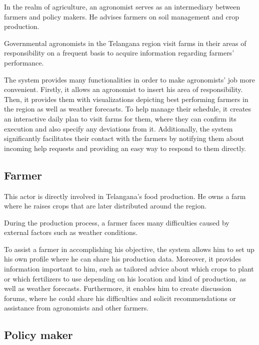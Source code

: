 In the realm of agriculture, an agronomist serves as an intermediary between farmers and policy makers. He advises farmers on soil management and crop production.

Governmental agronomists in the Telangana region visit farms in their areas of responsibility on a frequent basis to acquire information regarding farmers' performance.

The system provides many functionalities in order to make agronomists' job more convenient. Firstly, it allows an agronomist to insert his area of responsibility. Then, it provides them with visualizations depicting best performing farmers in the region as well as weather forecasts. To help manage their schedule, it creates an interactive daily plan to visit farms for them, where they can confirm its execution and also specify any deviations from it. Additionally, the system significantly facilitates their contact with the farmers by notifying them about incoming help requests and providing an easy way to respond to them directly.

\subsection{Farmer}

This actor is directly involved in Telangana's food production. He owns a farm where he raises crops that are later distributed around the region.

During the production process, a farmer faces many difficulties caused by external factors such as weather conditions.

To assist a farmer in accomplishing his objective, the system allows him to set up his own profile where he can share his production data. Moreover, it provides information important to him, such as tailored advice about which crops to plant or which fertilizers to use depending on his location and kind of production, as well as weather forecasts. Furthermore, it enables him to create discussion forums, where he could share his difficulties and solicit recommendations or assistance from agronomists and other farmers.

\subsection{Policy maker}

